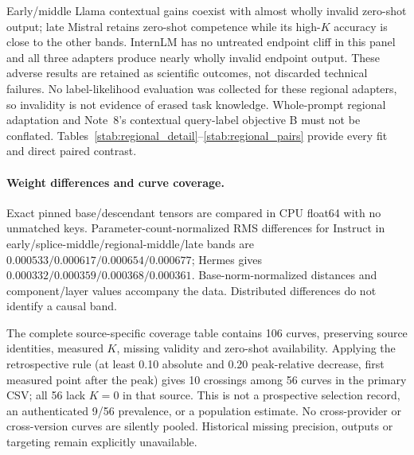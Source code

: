 Early/middle Llama contextual gains coexist with almost wholly invalid zero-shot output; late Mistral retains zero-shot competence while its high-$K$ accuracy is close to the other bands. InternLM has no untreated endpoint cliff in this panel and all three adapters produce nearly wholly invalid endpoint output. These adverse results are retained as scientific outcomes, not discarded technical failures. No label-likelihood evaluation was collected for these regional adapters, so invalidity is not evidence of erased task knowledge. Whole-prompt regional adaptation and Note~8's contextual query-label objective B must not be conflated. Tables~\ref{stab:regional_detail}--\ref{stab:regional_pairs} provide every fit and direct paired contrast.

\paragraph{Weight differences and curve coverage.} Exact pinned base/descendant tensors are compared in CPU float64 with no unmatched keys. Parameter-count-normalized RMS differences for Instruct in early/splice-middle/regional-middle/late bands are $0.000533/0.000617/0.000654/0.000677$; Hermes gives $0.000332/0.000359/0.000368/0.000361$. Base-norm-normalized distances and component/layer values accompany the data. Distributed differences do not identify a causal band.

The complete source-specific coverage table contains 106 curves, preserving source identities, measured $K$, missing validity and zero-shot availability. Applying the retrospective rule (at least 0.10 absolute and 0.20 peak-relative decrease, first measured point after the peak) gives 10 crossings among 56 curves in the primary CSV; all 56 lack $K=0$ in that source. This is not a prospective selection record, an authenticated 9/56 prevalence, or a population estimate. No cross-provider or cross-version curves are silently pooled. Historical missing precision, outputs or targeting remain explicitly unavailable.
\endgroup


